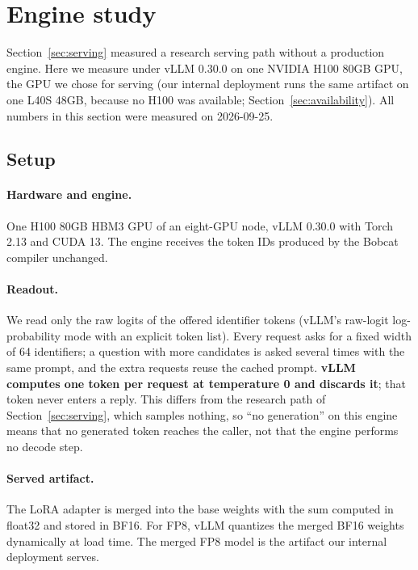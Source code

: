 \section{Engine study}
\label{sec:engine}

Section~\ref{sec:serving} measured a research serving path without a production engine. Here
we measure \expone{} under vLLM 0.30.0 \citep{kwon2023vllm} on one NVIDIA H100 80GB GPU, the
GPU we chose for serving (our internal deployment runs the same artifact on one L40S 48GB,
because no H100 was available; Section~\ref{sec:availability}). All numbers in this section
were measured on 2026-09-25.

\subsection{Setup}
\label{sec:engine_setup}

\paragraph{Hardware and engine.}
One H100 80GB HBM3 GPU of an eight-GPU node, vLLM 0.30.0 with
Torch 2.13 and CUDA 13. The engine receives the token IDs produced by the Bobcat compiler
unchanged.

\paragraph{Readout.}
We read only the raw logits of the offered identifier tokens (vLLM's raw-logit log-probability
mode with an explicit token list). Every request asks for a fixed width of 64 identifiers; a
question with more candidates is asked several times with the same prompt, and the extra
requests reuse the cached prompt. \textbf{vLLM computes one token per request at temperature
0 and discards it}; that token never enters a reply. This differs from the research path of
Section~\ref{sec:serving}, which samples nothing, so ``no generation'' on this engine means
that no generated token reaches the caller, not that the engine performs no decode step.

\paragraph{Served artifact.}
The LoRA adapter is merged into the base weights with the sum computed in float32 and stored
in BF16. For FP8, vLLM quantizes the merged BF16 weights dynamically at load time. The merged
FP8 model is the artifact our internal deployment serves.

